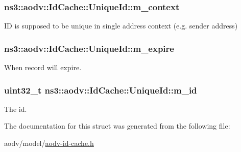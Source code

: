 \subsubsection[{\texorpdfstring{m\+\_\+context}{m_context}}]{ ns3\+::aodv\+::\+Id\+Cache\+::\+Unique\+Id\+::m\+\_\+context}\hypertarget{structns3_1_1aodv_1_1IdCache_1_1UniqueId_af2e1e7b547b9a93001af9237e2903011}{}\label{structns3_1_1aodv_1_1IdCache_1_1UniqueId_af2e1e7b547b9a93001af9237e2903011}


ID is supposed to be unique in single address context (e.\+g. sender address) 

\subsubsection[{\texorpdfstring{m\+\_\+expire}{m_expire}}]{ ns3\+::aodv\+::\+Id\+Cache\+::\+Unique\+Id\+::m\+\_\+expire}\hypertarget{structns3_1_1aodv_1_1IdCache_1_1UniqueId_a166a2c28a2a2fbbf314b47a308c5fd3d}{}\label{structns3_1_1aodv_1_1IdCache_1_1UniqueId_a166a2c28a2a2fbbf314b47a308c5fd3d}


When record will expire. 

\subsubsection[{\texorpdfstring{m\+\_\+id}{m_id}}]{\setlength{\rightskip}{0pt plus 5cm}uint32\+\_\+t ns3\+::aodv\+::\+Id\+Cache\+::\+Unique\+Id\+::m\+\_\+id}\hypertarget{structns3_1_1aodv_1_1IdCache_1_1UniqueId_a7436c8b104a31e26c0ce06b103045110}{}\label{structns3_1_1aodv_1_1IdCache_1_1UniqueId_a7436c8b104a31e26c0ce06b103045110}


The id. 



The documentation for this struct was generated from the following file\+:\begin{DoxyCompactItemize}
\item 
aodv/model/\hyperlink{aodv-id-cache_8h}{aodv-\/id-\/cache.\+h}\end{DoxyCompactItemize}
